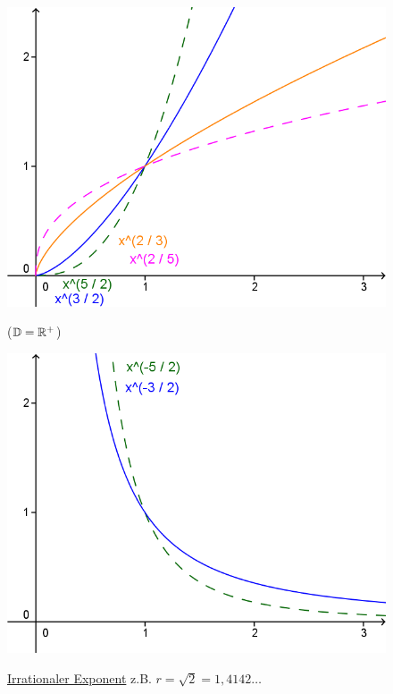 \begin{enumerate}[A)]
\begin{figure}[h!]
\begin{minipage}{0.49\linewidth}
			\centering \includegraphics[width=0.9\linewidth]{Bilder/163}
			\caption{}
		\end{minipage}
		\begin{minipage}{0.49\linewidth}
			 ($\mathbb{D}=\mathbb{R}^+$)
			
			\centering \includegraphics[width=0.9\linewidth]{Bilder/164}
			\caption{}
		\end{minipage}
	\end{figure}
	
	\begin{figure}[h!]
		\item \ul{Irrationaler Exponent} z.B. $r=\sqrt{2} = 1{,}4142\ldots$
			

\end{figure}
\end{enumerate}
